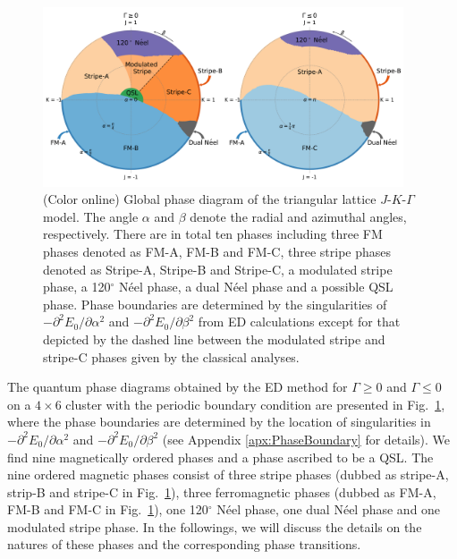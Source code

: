 \documentclass[aps,prb,reprint,amsfonts,amsmath,amssymb,showpacs,groupedaddress,superscriptaddress]{revtex4-1}
\begin{document}
\begin{figure}
    \centering
    \includegraphics[width=0.95\textwidth]{fig/QuantumGlobalPhaseDiagram.pdf}
    \caption{\label{fig:QuantumPhaseDiagram}(Color online) Global phase diagram of the triangular lattice $J$-$K$-$\Gamma$ model. The angle $\alpha$ and $\beta$ denote the radial and azimuthal angles, respectively. There are in total ten phases including three FM phases denoted as FM-A, FM-B and FM-C, three stripe phases denoted as Stripe-A, Stripe-B and Stripe-C, a modulated stripe phase, a 120$^\circ$ N\'{e}el phase, a dual N\'{e}el phase and a possible QSL phase. Phase boundaries are determined by the singularities of $-\partial^2E_0/\partial\alpha^2$ and $-\partial^2E_0/\partial\beta^2$ from ED calculations except for that depicted by the dashed line between the modulated stripe and stripe-C phases given by the classical analyses.}
\end{figure}

The quantum phase diagrams obtained by the ED method for $\Gamma \geq 0$ and $\Gamma \leq 0$ on a $4 \times 6$ cluster with the periodic boundary condition are presented in Fig.~\ref{fig:QuantumPhaseDiagram}, where the phase boundaries are determined by the location of singularities in $-\partial^2E_0/\partial\alpha^2$ and $-\partial^2E_0/\partial\beta^2$ (see Appendix \ref{apx:PhaseBoundary} for details). We find nine magnetically ordered phases and a phase ascribed to be a QSL. The nine ordered magnetic phases consist of three stripe phases (dubbed as stripe-A, strip-B and stripe-C in Fig.~\ref{fig:QuantumPhaseDiagram}), three ferromagnetic phases (dubbed as FM-A, FM-B and FM-C in Fig.~\ref{fig:QuantumPhaseDiagram}), one 120$^\circ$ N\'{e}el phase, one dual N\'{e}el phase and one modulated stripe phase. In the followings, we will discuss the details on the natures of these phases and the corresponding phase transitions.
\end{document}
